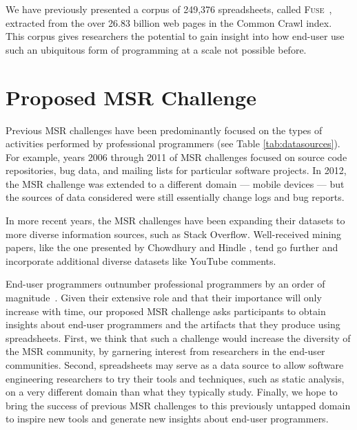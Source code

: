 \documentclass[conference]{IEEEtran}
\begin{document}
We have previously presented a corpus of 249,376 spreadsheets, called \textsc{Fuse}~\cite{barik2015}, extracted from the over 26.83 billion web pages in the Common Crawl index.
This corpus gives researchers the potential to gain insight into how end-user use such an ubiquitous form of programming at a scale not possible before.


\section{Proposed MSR Challenge}
Previous MSR challenges have been predominantly focused on the types of activities performed by professional programmers (see Table \ref{tab:datasources}). 
For example, years 2006 through 2011 of MSR challenges focused on source code repositories, bug data, and mailing lists for particular software projects. 
In 2012, the MSR challenge was extended to a different domain --- mobile devices --- but the sources of data considered were still essentially change logs and bug reports. 

In more recent years, the MSR challenges have been expanding their datasets to more diverse information sources, such as Stack Overflow.
Well-received mining papers, like the one presented by Chowdhury and Hindle \cite{chowdhury2015}, tend go further and incorporate additional diverse datasets like YouTube comments.

End-user programmers outnumber professional programmers by an order of magnitude~\cite{Scaffidi2005}.
Given their extensive role and that their importance will only increase with time, our proposed MSR challenge asks participants to obtain insights about end-user programmers and the artifacts that they produce using spreadsheets. 
First, we think that such a challenge would increase the diversity of the MSR community, by garnering interest from researchers in the end-user communities. 
Second, spreadsheets may serve as a data source to allow software engineering researchers to try their tools and techniques, such as static analysis, on a very different domain than what they typically study. 
Finally, we hope to bring the success of previous MSR challenges to this previously untapped domain to inspire new tools and generate new insights about end-user programmers.

\end{document}
